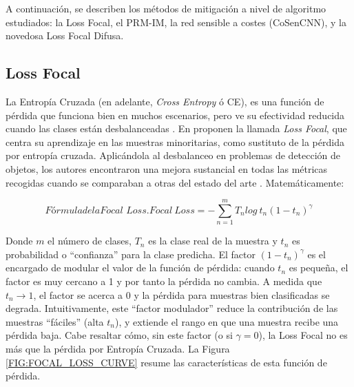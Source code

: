A continuación, se describen los métodos de mitigación a nivel de algoritmo estudiados: la Loss Focal, el PRM-IM, la red sensible a costes (CoSenCNN), y la novedosa Loss Focal Difusa. %

\subsection{Loss Focal\label{SUBSEC:FOCAL_LOSS}}

La Entropía Cruzada (en adelante, \textit{Cross Entropy} ó CE), es una función de pérdida que funciona bien en muchos escenarios, pero ve su efectividad reducida cuando las clases están desbalanceadas \cite{hong2021fuzzy}. En \citet{lin2017focal} proponen la llamada \textit{Loss Focal}, que centra su aprendizaje en las muestras minoritarias, como sustituto de la pérdida por entropía cruzada. Aplicándola al desbalanceo en problemas de detección de objetos, los autores encontraron una mejora sustancial en todas las métricas recogidas cuando se comparaban a otras del estado del arte \cite{lin2017focal}. Matemáticamente:

\begin{equation}[EQ:FOCAL_LOSS]{Fórmula de la \textit{Focal Loss}.}
   Focal\ Loss = -\sum_{n=1}^{m}{T_n log\ t_n (1 - t_n)^\gamma}
\end{equation}

Donde $m$ el número de clases, $T_n$ es la clase real de la muestra y $t_n$ es probabilidad o ``confianza'' para la clase predicha. El factor $(1 - t_n)^\gamma$ es el encargado de modular el valor de la función de pérdida: cuando $t_n$ es pequeña, el factor es muy cercano a 1 y por tanto la pérdida no cambia. A medida que $t_n \rightarrow 1$, el factor se acerca a 0 y la pérdida para muestras bien clasificadas se degrada. Intuitivamente, este ``factor modulador'' reduce la contribución de las muestras ``fáciles'' (alta $t_n$), y extiende el rango en que una muestra recibe una pérdida baja. Cabe resaltar cómo, sin este factor (o si $\gamma = 0$), la Loss Focal no es más que la pérdida por Entropía Cruzada. La Figura \ref{FIG:FOCAL_LOSS_CURVE} resume las características de esta función de pérdida.

